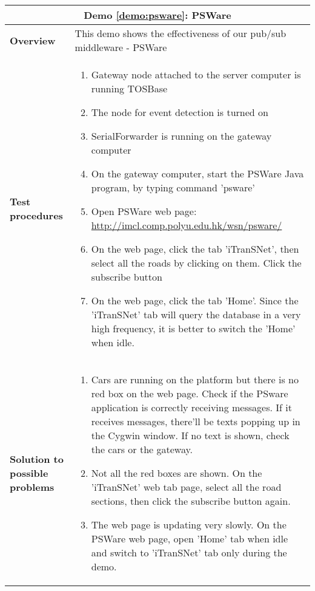 \begin{center}
	\begin{tabular}{ | p{2cm} | p{10cm} | }
		\hline
		\multicolumn{2}{|c|}{\textbf{Demo \ref{demo:psware}: PSWare}} \\ \hline
		\textbf{Overview} &  This demo shows the effectiveness of our pub/sub middleware - PSWare \\ \hline
		\textbf{Test procedures} &
		\begin{enumerate}
		\item Gateway node attached to the server computer is running TOSBase
		\item The node for event detection is turned on
		\item SerialForwarder is running on the gateway computer
		\item On the gateway computer, start the PSWare Java program, by typing command 'psware'
		\item Open PSWare web page: \url{http://imcl.comp.polyu.edu.hk/wsn/psware/}
		\item On the web page, click the tab 'iTranSNet', then select all the roads by clicking on them. Click the subscribe button
		\item On the web page, click the tab 'Home'. Since the 'iTranSNet' tab will query the database in a very high frequency, it is better to switch the 'Home' when idle.
		\end{enumerate} \\ \hline
		\textbf{Solution to possible problems} &
		\begin{enumerate}
		\item Cars are running on the platform but there is no red box on the web page. Check if the PSware application is correctly receiving messages. If it receives messages, there'll be texts popping up in the Cygwin window. If no text is shown, check the cars or the gateway. 
		\item Not all the red boxes are shown. On the 'iTranSNet' web tab page, select all the road sections, then click the subscribe button again.
		\item The web page is updating very slowly. On the PSWare web page, open 'Home' tab when idle and switch to 'iTranSNet' tab only during the demo.
		\end{enumerate}  \\
		\hline
	\end{tabular}
\end{center}
